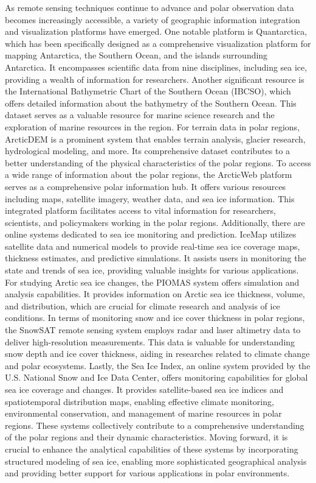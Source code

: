 As remote sensing techniques continue to advance and polar observation data becomes increasingly accessible, a variety of geographic information integration and visualization platforms have emerged. One notable platform is Quantarctica\cite{190matsuoka2021quantarctica}, which has been specifically designed as a comprehensive visualization platform for mapping Antarctica, the Southern Ocean, and the islands surrounding Antarctica. It encompasses scientific data from nine disciplines, including sea ice, providing a wealth of information for researchers. Another significant resource is the International Bathymetric Chart of the Southern Ocean (IBCSO)\cite{194dorschel2022international}, which offers detailed information about the bathymetry of the Southern Ocean. This dataset serves as a valuable resource for marine science research and the exploration of marine resources in the region. For terrain data in polar regions, ArcticDEM is a prominent system that enables terrain analysis, glacier research, hydrological modeling, and more. Its comprehensive dataset contributes to a better understanding of the physical characteristics of the polar regions. To access a wide range of information about the polar regions, the ArcticWeb platform serves as a comprehensive polar information hub. It offers various resources including maps, satellite imagery, weather data, and sea ice information. This integrated platform facilitates access to vital information for researchers, scientists, and policymakers working in the polar regions. Additionally, there are online systems dedicated to sea ice monitoring and prediction. IceMap utilizes satellite data and numerical models to provide real-time sea ice coverage maps, thickness estimates, and predictive simulations. It assists users in monitoring the state and trends of sea ice, providing valuable insights for various applications. For studying Arctic sea ice changes, the PIOMAS system offers simulation and analysis capabilities. It provides information on Arctic sea ice thickness, volume, and distribution, which are crucial for climate research and analysis of ice conditions. In terms of monitoring snow and ice cover thickness in polar regions, the SnowSAT remote sensing system employs radar and laser altimetry data to deliver high-resolution measurements. This data is valuable for understanding snow depth and ice cover thickness, aiding in researches related to climate change and polar ecosystems. Lastly, the Sea Ice Index, an online system provided by the U.S. National Snow and Ice Data Center, offers monitoring capabilities for global sea ice coverage and changes. It provides satellite-based sea ice indices and spatiotemporal distribution maps, enabling effective climate monitoring, environmental conservation, and management of marine resources in polar regions. These systems collectively contribute to a comprehensive understanding of the polar regions and their dynamic characteristics. Moving forward, it is crucial to enhance the analytical capabilities of these systems by incorporating structured modeling of sea ice, enabling more sophisticated geographical analysis and providing better support for various applications in polar environments.

